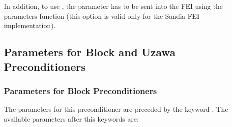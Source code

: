 In addition, to use , the parameter  has to be sent
into the FEI using the parameters function (this option is valid only for the
Sandia FEI implementation).
                                                                                
\subsection{Parameters for Block and Uzawa Preconditioners}
\subsubsection{Parameters for Block Preconditioners}
The parameters for this preconditioner are preceded by the keyword 
.
The available parameters after this keywords are:
